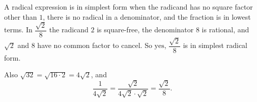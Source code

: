 A radical expression is in simplest form when the radicand has no square factor other than $1$, there is no radical in a denominator, and the fraction is in lowest terms. In $\dfrac{\sqrt2}{8}$ the radicand $2$ is square-free, the denominator $8$ is rational, and $\sqrt2$ and $8$ have no common factor to cancel. So $\boxed{\text{yes}}$, $\dfrac{\sqrt2}{8}$ is in simplest radical form.

Also $\sqrt{32}=\sqrt{16\cdot2}=4\sqrt2$, and
\[
\dfrac{1}{4\sqrt2}=\dfrac{\sqrt2}{4\sqrt2\cdot\sqrt2}=\dfrac{\sqrt2}{8}.
\]
